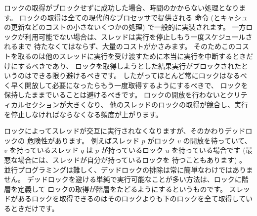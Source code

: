 ロックの取得がブロックせずに成功した場合、時間のかからない処理となります。
ロックの取得は全ての現代的なプロセッサで提供される  命令
(とキャシュの更新などのコストの小さないくつかの処理) で一般的に実装されます。
一方ロックが利用可能でない場合は、スレッドは実行を停止しもう一度スケジュールされるまで
待たなくてはならず、大量のコストがかさみます。
そのためこのコストを取るのは他のスレッドに実行を受け渡すために本当に実行を中断するときだけにするべきであり、
ロックを取得しようとした結果実行がブロックされたというのはできる限り避けるべきです。
したがってほとんど常にロックはなるべく早く開放して必要になったらもう一度取得するようにするべきで、
ロックを保持したままでいることは避けるべきです。
ロックの開放を行わないとクリティカルセクションが大きくなり、
他のスレッドのロックの取得が競合し、実行を停止しなければならなくなる頻度が上がります。

ロックによってスレッドが交互に実行されなくなりますが、そのかわりデッドロックの
危険性があります。
例えばスレッド $p$ がロック $v$ の開放を待っていて、$v$ を持っているスレッド $q$ は
$p$ が持っているロック $u$ を待っている場合です (最悪な場合には、スレッドが自分が持っているロックを
待つこともあります) 。
並行プログラミングは難しく、デッドロックの排除は常に簡単なわけではありません。
デッドロックを避ける単純で実行可能なことが多い方法は、ロックに階層を定義して
ロックの取得が階層をたどるようにするというものです。
スレッドがあるロックを取得できるのはそのロックよりも下のロックを全て取得しているときだけです。

